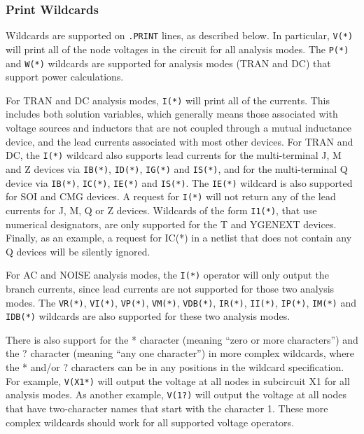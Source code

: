 \subsubsection{Print Wildcards}
\label{Print_Wildcards}
Wildcards are supported on \texttt{.PRINT} lines, as described below.  In particular, 
\texttt{V(*)} will print all of the node voltages in the circuit for all
analysis modes.  The \texttt{P(*)}  and \texttt{W(*)} wildcards are supported
for analysis modes (TRAN and DC) that support power calculations.

For TRAN and DC analysis modes, \texttt{I(*)} will print all of the
currents.  This includes both solution variables, which generally means those
associated  with voltage sources and inductors that are not coupled through
a mutual inductance device, and the lead currents associated with most
other devices.  For TRAN and DC, the \texttt{I(*)} wildcard also supports
lead currents for the multi-terminal J, M and Z devices via
\texttt{IB(*)}, \texttt{ID(*)}, \texttt{IG(*)} and \texttt{IS(*)}, and 
for the multi-terminal Q device via \texttt{IB(*)}, \texttt{IC(*)}, \texttt{IE(*)}
and \texttt{IS(*)}.  The \texttt{IE(*)} wildcard is also supported for SOI
and CMG devices.  A  request for \texttt{I(*)} will not return any of the lead currents
for  J, M, Q or Z devices.  Wildcards of the form \texttt{I1(*)},
that use numerical designators, are only supported for the T and YGENEXT devices.
Finally, as an example, a request for IC(*) in a netlist that does not contain
any Q devices will be silently ignored. 

For AC and NOISE analysis modes, the \texttt{I(*)} operator will only output
the branch currents, since lead currents are not supported for those two
analysis modes.  The \texttt{VR(*)}, \texttt{VI(*)}, \texttt{VP(*)},
\texttt{VM(*)}, \texttt{VDB(*)}, \texttt{IR(*)}, \texttt{II(*)},
\texttt{IP(*)}, \texttt{IM(*)} and \texttt{IDB(*)} wildcards are also
supported for these two analysis modes.

There is also support for the * character (meaning ``zero or more
characters'') and the ? character (meaning ``any one character'') in more
complex wildcards, where the * and/or ? characters can be in
any positions in the wildcard specification.  For example, \texttt{V(X1*)}
will output the voltage at all nodes in subcircuit X1 for all analysis
modes.  As another example, \texttt{V(1?)} will output the voltage at all
nodes that have two-character names that start with the character 1.  These
more complex wildcards should work for all supported voltage operators.

